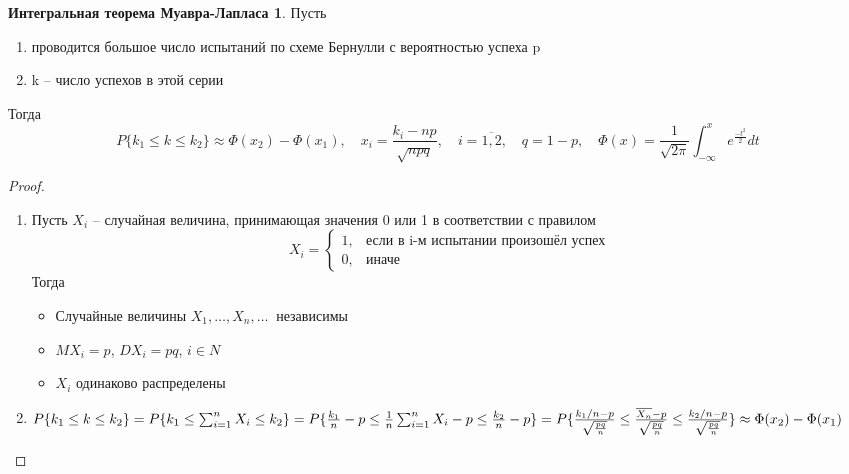 \documentclass[a4paper, 12pt]{article}
\theoremstyle{definition}
\theoremstyle{leads}
\theoremstyle{example}
\newcommand{\infseq}[3]{%
	\ensuremath{#1_#2, \dots, #1_#3, \dots}\ }
\newcommand{\infseqX}{%
	\infseq{X}{1}{n}}
\begin{document}
\newtheorem*{mlap}{Интегральная теорема Муавра-Лапласа}
\begin{mlap}
	Пусть 
	\begin{enumerate}
	  \item проводится большое число испытаний по схеме Бернулли с вероятностью успеха p
	  \item k -- число успехов в этой серии 
	\end{enumerate}
Тогда 
\begin{displaymath}
	P\{k_1 \leq k \leq k_2\} \approx \Phi(x_2) - \Phi(x_1), \quad  x_i = \frac{k_i - np}{\sqrt{npq}}, \quad i = \overline{1,2}, \quad q = 1 - p, \quad 
	\Phi(x) = \frac{1}{\sqrt{2 \pi}} \int_{-\infty}^{x} e^{\frac{-t^2}{2}} dt
\end{displaymath}
\end{mlap}
\begin{proof}
	\begin{enumerate}
		\item Пусть $X_i$ -- случайная величина, принимающая значения 0 или 1 в соответствии с правилом
	    \begin{displaymath}
		X_i = \begin{cases}
		1, & \text{если в i-м испытании произошёл успех}\\
		0, & \text{иначе}
		\end{cases}
		\end{displaymath}
	Тогда 
	\begin{itemize}
		\item Случайные величины $\infseqX$ независимы
		\item $MX_i = p$, $DX_i = pq$, $i \in N$
		\item $X_i$ одинаково распределены
	\end{itemize}
 \item
 	 	$P\{k_1 \leq k \leq k_2\} = P\{k_1 \leq \sum_{i=1}^{n}X_i \leq k_2\} = P\{\frac{k_1}{n} - p \leq \frac{1}{n}\sum_{i=1}^{n} X_i - p \leq \frac{k_2}{n} - p\} =	\\
 	P\{\frac{k_1/n - p}{\sqrt{\frac{pq}{n}}} \leq \frac{\overline{X_n} - p}{\sqrt{\frac{pq}{n}}} \leq \frac{k_2/n - p}{\sqrt{\frac{pq}{n}}}\} \approx \Phi(x_2) - \Phi(x_1)$
	\end{enumerate}
\end{proof}
\end{document}
